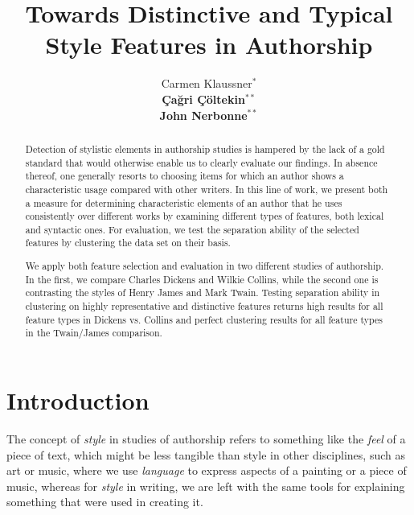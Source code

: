 \documentclass[a4paper,10pt,twoside,fleqn]{article}
\begin{document}
\title{Towards Distinctive and Typical Style Features in Authorship}


\author{Carmen Klaussner$^*$ \\
{\normalsize \bf \c{C}a\u{g}ri \c{C}öltekin}$^{**}$ \\
{\normalsize \bf John Nerbonne}$^{**}$ 
\AND {}
\AND {} }


\maketitle\thispagestyle{empty} %


\begin{abstract}
Detection of stylistic elements in authorship studies is hampered
by the lack of a gold standard that would otherwise enable us to 
clearly evaluate our findings. In absence thereof, one generally 
resorts to choosing items for which an author shows a 
characteristic usage compared with other writers. 
In this line of work, we present both a measure for determining 
characteristic elements of an author that he uses consistently
over different works by examining different types of features, 
both lexical and syntactic ones.
For evaluation, we test the separation ability of the selected 
features by clustering the data set on their basis.

We apply both feature selection and evaluation in two different
studies of authorship. In the first, we compare Charles Dickens 
and Wilkie Collins, while the second one is contrasting the 
styles of Henry James and Mark Twain. Testing separation ability 
in clustering on highly representative and distinctive features 
returns high results for all feature types in Dickens 
vs. Collins and perfect clustering results for all feature types
in the Twain/James comparison.
\end{abstract}




\section{Introduction}

The concept of \emph{style} in studies of authorship refers to 
something like the \emph{feel} of a piece of text, which might be less
tangible than style in other disciplines, such as art or music, 
where we use \emph{language} to express aspects of a 
painting or a piece of music, whereas for \emph{style} in writing, 
we are left with the same tools for explaining something that were
used in creating it. 
\end{document}
